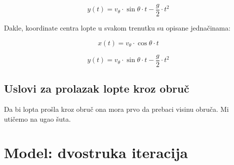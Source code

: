 \documentclass[a4paper, 12pt]{article}
\begin{document}
\[y(t) = v_{\theta} \cdot \sin \theta\cdot t - \dfrac{g}{2} \cdot t^2\]

Dakle, koordinate centra lopte u svakom trenutku su opisane jednačinama:

\[x(t) = v_\theta \cdot \cos \theta \cdot t\]

\[y(t) = v_{\theta} \cdot \sin \theta \cdot t - \dfrac{g}{2} \cdot t^2\]

\subsection{Uslovi za prolazak lopte kroz obruč}

Da bi lopta prošla kroz obruč ona mora prvo da prebaci visinu obruča. Mi utičemo na ugao šuta.

\section{Model: dvostruka iteracija}
\end{document}
